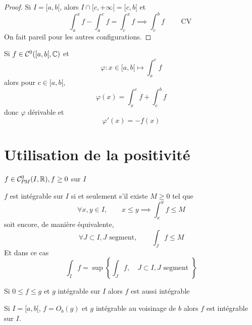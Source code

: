 \begin{proof}
    Si $I=[a, b[$, alors $I\cap [c, +\infty[=[c, b[$ et \[
        \int_a^xf-\int_a^cf=\int_c^xf\implies \int_c^bf\qquad \text{ CV }
    \]
    On fait pareil pour les autres configurations.
\end{proof}

\begin{rem}
    Si $f\in \mathcal C^0([a, b[, \mathbb C)$ et \[
        \varphi: x\in [a, b[\longmapsto \int_x^cf
    \]
    alors pour $c\in [a, b[$, \[
        \varphi(x)=\int_x^cf+\int_c^bf
    \]
    donc $\varphi$ dérivable et \[
        \varphi'(x)=-f(x)
    \]
\end{rem}

\section{Utilisation de la positivité}

\begin{prop}
    \Hyp $f\in\CPM(I, \R), f\geq 0$ sur $I$
    \begin{concenum}
    \item $f$ est intégrable sur $I$ si et seulement s'il existe $M\geq 0$ tel que \[
            \forall x, y\in I, \qquad x\leq y\implies \int_x^yf\leq M
        \]
        soit encore, de manière équivalente, \[
            \forall J\subset I, J\text{ segment},\qquad  \int_Jf\leq M
        \]
        Et dans ce cas \[
            \int_If=\sup \left\{ \int_Jf,\quad J\subset I, J\text{ segment } \right\}
        \]
    \item Si $0\leq f\leq g$ et $g$ intégrable sur $I$ alors $f$ est aussi intégrable
    \item Si $I=[a, b[$, $f=O_b(g)$ et $g$ intégrable au voisinage de $b$ alors $f$ est intégrable sur $I$.
    \end{concenum}
\end{prop}

